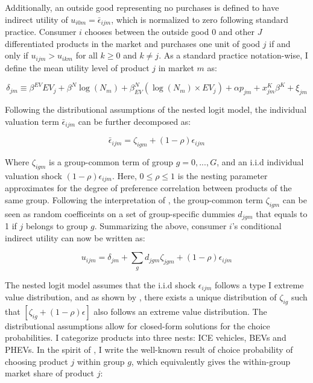 \documentclass[12pt]{article}
\begin{document}
Additionally, an outside good representing no purchases is defined to have indirect utility of $u_{i0m} = \bar{\epsilon}_{ijm}$, which is normalized to zero following standard practice.
Consumer $i$ chooses between the outside good 0 and other $J$ differentiated products in the market and purchases one unit of good $j$ if and only if $u_{ijm} > u_{ikm}$ for all $k \geq 0$ and $k \neq j$. 
As a standard practice notation-wise, I define the mean utility level of product $j$ in market $m$ as:

\begin{equation}
    \delta_{jm} \equiv \beta^{EV} EV_j+ \beta^N \log(N_m) + \beta^N_{EV} (\log(N_m) \times EV_j) + \alpha p_{jm} + x^{K}_{jm} \beta^{K} + \xi_{jm}
\end{equation}

Following the distributional assumptions of the nested logit model, the individual valuation term $\bar{\epsilon}_{ijm}$ can be further decomposed as:

\begin{equation}
    \bar{\epsilon}_{ijm} = \zeta_{igm} + (1 - \rho) \epsilon_{ijm}
\end{equation}

Where $\zeta_{igm}$ is a group-common term of group $g = 0,...,G$, and an i.i.d individual valuation shock $(1 - \rho) \epsilon_{ijm}$. Here, $0 \leq \rho \leq 1$ is the nesting parameter approximates for the degree of preference correlation between products of the same group. 
Following the interpretation of \citet{berry_estimating_1994}, the group-common term $\zeta_{igm}$ can be seen as random coefficeints on a set of group-specific dummies $d_{jgm}$ that equals to 1 if $j$ belongs to group $g$.
Summarizing the above, consumer $i$'s conditional indirect utility can now be written as:

\begin{equation}
    u_{ijm} = \delta_{jm} + \sum_{g} d_{jgm}\zeta_{jgm} + (1 - \rho) \epsilon_{ijm}
\end{equation}

The nested logit model assumes that the i.i.d shock $\epsilon_{ijm}$ follows a type I extreme value distribution, 
and as shown by \citet{cardell_variance_1997}, there exists a unique distribution of $\zeta_{ig}$ such that $[\zeta_{ig} + (1-\rho)\epsilon]$ also follows an extreme value distribution. 
The distributional assumptions allow for closed-form solutions for the choice probabilities. I categorize products into three nests: ICE vehicles, BEVs and PHEVs. 
In the spirit of \citet{berry_estimating_1994}, I write the well-known result of choice probability of choosing product $j$ within group $g$, which equivalently gives the within-group market share of product $j$:
\end{document}
